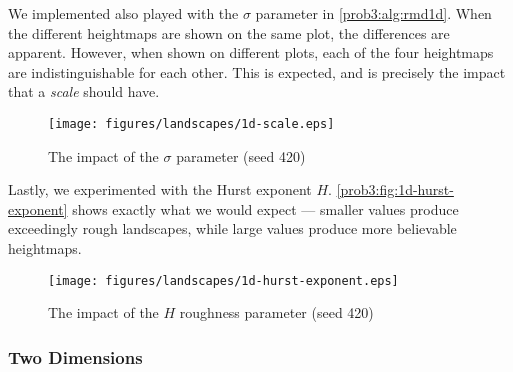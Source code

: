 We implemented also played with the $\sigma$ parameter in \autoref{prob3:alg:rmd1d}. When the different heightmaps are shown on the same plot, the differences are apparent.
However, when shown on different plots, each of the four heightmaps are indistinguishable for each other.
This is expected, and is precisely the impact that a \textit{scale} should have.

\begin{figure}[H]
    \centering
    \texttt{[image: figures/landscapes/1d-scale.eps]}
    \caption{The impact of the $\sigma$ parameter (seed 420)}\label{prob3:fig:1d-scale}
\end{figure}

Lastly, we experimented with the Hurst exponent $H$.
\autoref{prob3:fig:1d-hurst-exponent} shows exactly what we would expect --- smaller values produce exceedingly rough landscapes, while large values produce more believable heightmaps.

\begin{figure}[H]
    \centering
    \texttt{[image: figures/landscapes/1d-hurst-exponent.eps]}
    \caption{The impact of the $H$ roughness parameter (seed 420)}\label{prob3:fig:1d-hurst-exponent}
\end{figure}

\subsubsection{Two Dimensions}
